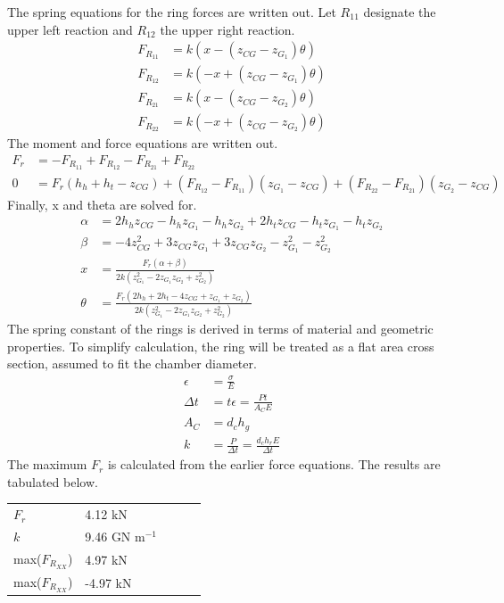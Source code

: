 \documentclass[10pt,a4paper]{article}
\begin{document}
	The spring equations for the ring forces are written out. Let $R_{11}$ designate the upper left reaction and $R_{12}$ the upper right reaction.
	\begin{align}
		F_{R_{11}} &= k(x - (z_{CG}-z_{G_1}) \theta) \\
		F_{R_{12}} &= k(-x + (z_{CG}-z_{G_1}) \theta) \\
		F_{R_{21}} &= k(x - (z_{CG}-z_{G_2}) \theta) \\
		F_{R_{22}} &= k(-x + (z_{CG}-z_{G_2}) \theta) 
	\end{align}
	The moment and force equations are written out.
	\begin{align}
		F_r &= - F_{R_{11}} + F_{R_{12}} - F_{R_{21}} + F_{R_{22}}\\
		0 &= F_r (h_h + h_t - z_{CG}) + (F_{R_{12}} - F_{R_{11}})(z_{G_1} - z_{CG})+ (F_{R_{22}} - F_{R_{21}})(z_{G_2} - z_{CG})
	\end{align}
	Finally, x and theta are solved for.
	\begin{align}
	\alpha &= 2 h_{h} z_{CG} - h_{h} z_{G_1} - h_{h} z_{G_2} + 2 h_{t} z_{CG} - h_{t} z_{G_1} - h_{t} z_{G_2}\\
	\beta &= - 4 z_{CG}^{2} + 3 z_{CG} z_{G_1} + 3 z_{CG} z_{G_2} - z_{G_1}^{2} - z_{G_2}^{2}\\
		x &= \frac{F_{r} \left(\alpha +\beta\right)}{2 k \left(z_{G_1}^{2} - 2 z_{G_1} z_{G_2} + z_{G_2}^{2}\right)}\\
		\theta &= \frac{F_{r} \left(2 h_{h} + 2 h_{t} - 4 z_{CG} + z_{G_1} + z_{G_2}\right)}{2 k \left(z_{G_1}^{2} - 2 z_{G_1} z_{G_2} + z_{G_2}^{2}\right)}
	\end{align}
	The spring constant of the rings is derived in terms of material and geometric properties. To simplify calculation, the ring will be treated as a flat area cross section, assumed to fit the chamber diameter.
	\begin{align}
		\epsilon &= \frac{\sigma}{E}\\
		\Delta t &= t \epsilon = \frac{Pt}{A_C E} \\
		A_C &= d_{c} h_g \\
		k &= \frac{P}{\Delta t} = \frac{d_{c} h_r E}{\Delta t}
	\end{align}
	The maximum $F_r$ is calculated from the earlier force equations. The results are tabulated below.
\begin{table}[H]
\begin{tabular}{lllll}
 $F_r$ & 4.12 kN \\
 $k$& 9.46 GN $\text{m}^{-1}$  \\
 max($F_{R_{XX}}$)&  4.97 kN \\
 max($F_{R_{XX}}$)&  -4.97 kN
\end{tabular}
\end{table}
\end{document}
